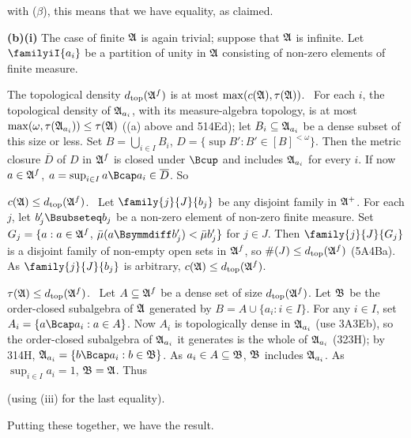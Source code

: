 {

\noindent with ($\beta$), this means that we have equality, as claimed.

\medskip

{\bf (b)(i)} The case of finite $\frak A$ is again trivial;  suppose that
$\frak A$ is infinite.   Let $\familyiI{a_i}$ be a partition of unity in
$\frak A$ consisting of non-zero elements of finite measure.

\medskip

 The topological density $d_{\text{top}}(\frak A^f)$ 
is at most $\max(c(\frak A),\tau(\frak A))$.
\Prf\ For each $i$, the topological density of $\frak A_{a_i}$, with its
measure-algebra topology, is at most
$\max(\omega,\tau(\frak A_{a_i}))\le\tau(\frak A)$ ((a) above and 514Ed);
let $B_i\subseteq\frak A_{a_i}$ be a dense subset of this size or less.   
Set $B=\bigcup_{i\in I}B_i$, $D=\{\sup B':B'\in[B]^{<\omega}\}$.
Then the metric closure $\overline{D}$ of $D$ in $\frak A^f$ is closed
under $\Bcup$ and includes $\frak A_{a_i}$ for every $i$.   If now
$a\in\frak A^f$, $a=\sup_{i\in I}a\Bcap a_i\in\overline{D}$.   So


\medskip

 $c(\frak A)\le d_{\text{top}}(\frak A^f)$.   \Prf\ Let
$\family{j}{J}{b_j}$
be any disjoint family in $\frak A^+$.
For each $j$, let $b_j'\Bsubseteq b_j$ be a non-zero element of non-zero
finite measure.   Set
$G_j=\{a:a\in\frak A^f$, $\bar\mu(a\Bsymmdiff b'_j)<\bar\mu b'_j\}$ for
$j\in J$.   Then $\family{j}{J}{G_j}$ is a disjoint family of non-empty
open sets in $\frak A^f$, so $\#(J)\le d_{\text{top}}(\frak A^f)$ (5A4Ba).   As
$\family{j}{J}{b_j}$ is arbitrary, 
$c(\frak A)\le d_{\text{top}}(\frak A^f)$.\ \Qed

\medskip

 $\tau(\frak A)\le d_{\text{top}}(\frak A^f)$.   \Prf\
Let $A\subseteq\frak A^f$ be a dense set of size 
$d_{\text{top}}(\frak A^f)$.  Let $\frak B$ be the order-closed
subalgebra of $\frak A$ generated by $B=A\cup\{a_i:i\in I\}$.   For any
$i\in I$, set
$A_i=\{a\Bcap a_i:a\in A\}$.   Now $A_i$ is topologically dense in
$\frak A_{a_i}$ (use 3A3Eb), so the order-closed subalgebra of
$\frak A_{a_i}$ it
generates is the whole of $\frak A_{a_i}$ (323H);  by 314H,
$\frak A_{a_i}=\{b\Bcap a_i:b\in\frak B\}$.   As
$a_i\in A\subseteq\frak B$, $\frak B$ includes $\frak A_{a_i}$.   As
$\sup_{i\in I}a_i=1$, $\frak B=\frak A$.   Thus


\noindent (using (iii) for the last equality).\ \Qed

\medskip

 Putting these together, we have the result.
}%

